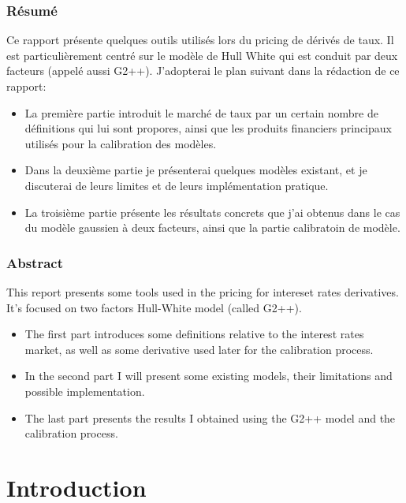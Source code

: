 

\newpage

\subsection*{Résumé}
  
  Ce rapport présente quelques outils utilisés lors du pricing de dérivés de taux. 
  Il est particulièrement centré sur le modèle de Hull White qui est conduit par deux facteurs (appelé aussi G2++).  J'adopterai le plan suivant dans la rédaction de ce rapport:
  \begin{itemize}
  \item 
    La première partie introduit le marché de taux par un certain nombre de définitions qui lui sont propores, ainsi que les produits financiers principaux utilisés pour la calibration des modèles.
  \item 
    Dans la deuxième partie je présenterai quelques modèles existant, et je discuterai de leurs limites et de leurs implémentation pratique.
  
  \item
    La troisième partie présente les résultats concrets que j'ai obtenus dans le cas du modèle gaussien à deux facteurs, ainsi que la partie calibratoin de modèle.
  \end{itemize}
  
\subsection*{Abstract} 
This report presents some tools used in the pricing for intereset rates derivatives. It's focused on two factors Hull-White model (called G2++).  
  \begin{itemize}
  \item
    The first part introduces some definitions relative to the interest rates market, as well as some derivative used later for the calibration process.
  \item
    In the second part I will present some existing models, their limitations and possible implementation.

  \item
    The last part presents the results I obtained using the G2++ model and the calibration process.
  \end{itemize}




\newpage
\chapter*{Introduction}

